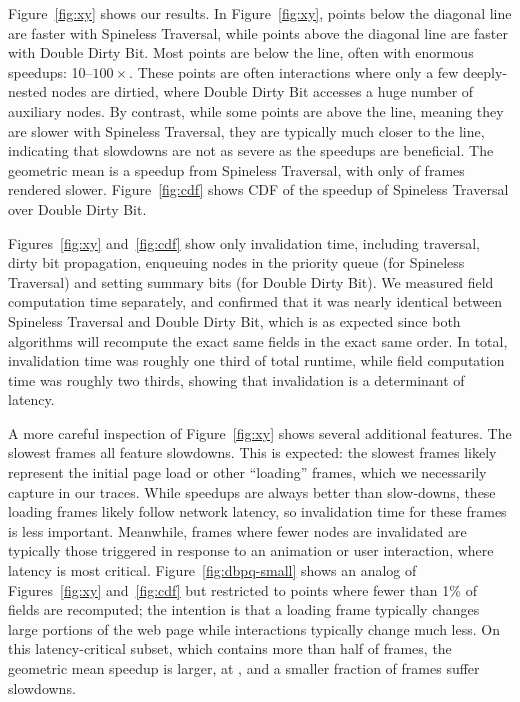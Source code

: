 Figure~\ref{fig:xy}
  shows our results.
In Figure~\ref{fig:xy}, points below the diagonal line
  are faster with Spineless Traversal,
  while points above the diagonal line
  are faster with Double Dirty Bit.
Most points are below the line,
  often with enormous speedups: 10--$100\times$.
These points are often interactions
  where only a few deeply-nested nodes are dirtied,
  where Double Dirty Bit accesses a huge number
  of auxiliary nodes.
By contrast, while some points are above the line,
  meaning they are slower with Spineless Traversal,
  they are typically much closer to the line,
  indicating that slowdowns are not as severe
  as the speedups are beneficial.
The geometric mean is a \MeanSpeedup speedup
  from Spineless Traversal,
  with only \PctSlower of frames rendered slower.
Figure~\ref{fig:cdf} shows CDF of the speedup
  of Spineless Traversal over Double Dirty Bit.

Figures~\ref{fig:xy} and~\ref{fig:cdf} show
  only invalidation time,
  including traversal, dirty bit propagation,
  enqueuing nodes in the priority queue (for Spineless Traversal)
  and setting summary bits (for Double Dirty Bit).
We measured field computation time separately,
  and confirmed that it was nearly identical
  between Spineless Traversal and Double Dirty Bit,
  which is as expected since both algorithms will
  recompute the exact same fields in the exact same order.
In total, invalidation time was roughly one third of total runtime,
  while field computation time was roughly two thirds,
  showing that invalidation is a determinant of latency.

A more careful inspection of Figure~\ref{fig:xy} shows
  several additional features.
The slowest frames all feature slowdowns.
This is expected: the slowest frames likely represent
  the initial page load or other ``loading'' frames,
  which we necessarily capture in our traces.
While speedups are always better than slow-downs,
  these loading frames likely follow network latency,
  so invalidation time for these frames is less important.
Meanwhile, frames where fewer nodes are invalidated
  are typically those triggered in response to
  an animation or user interaction,
  where latency is most critical.
Figure~\ref{fig:dbpq-small} shows an analog of
  Figures~\ref{fig:xy} and~\ref{fig:cdf}
  but restricted to points where fewer than 1\% of fields
  are recomputed;
  the intention is that a loading frame typically changes
  large portions of the web page
  while interactions typically change much less.
On this latency-critical subset,
  which contains more than half of frames,
  the geometric mean speedup is larger,
  at \MeanSpeedupSmall,
  and a smaller fraction of frames suffer slowdowns.

